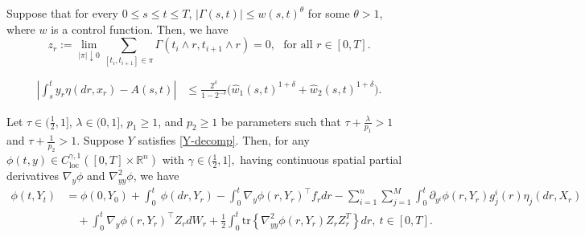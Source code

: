 \documentclass[10pt,a4paper]{amsart}
\begin{document}
\begin{lemma}\label{lem:control's property}
Suppose that for every $0\le s \le t \le T$, $|\Gamma(s,t)|\le w(s,t)^{\theta}$ for some $\theta > 1$, where $w$ is a control function.  Then, we have
\[z_{r} := \lim_{|\pi|\downarrow 0}\sum_{[t_{i},t_{i+1}]\in\pi} \Gamma(t_{i}\land r,t_{i+1}\land r)=0,\ \ \ \text{for all }r\in[0,T].
\] 
\end{lemma}

\begin{equation}\label{e:inequality-estimate-Young}
\begin{aligned}
\left|\int_{s}^{t} y_{r} \eta(dr,x_{r}) - A(s,t)\right| &\le \frac{2^{\delta}}{1-2^{-\delta}}\Big(\hat{w}_1(s,t)^{1+\delta}+\hat{w}_2(s,t)^{1+\delta}\Big).
\end{aligned}
\end{equation}

\begin{proposition}[It\^o's formula]\label{prop:Ito's formula} Let $ \tau\in(\frac12, 1]$, $ \lambda\in(0,1]$, $p_1\ge 1$, and  $p_2\ge1$ be parameters such that $\tau + \frac{\lambda}{p_{1}}>1$ and $\tau + \frac{1}{p_{2}}>1$.  Suppose $Y$ satisfies \eqref{Y-decomp}. Then, for any $\phi(t,y)\in C^{\gamma,1}_{\mathrm{loc}}([0,T]\times\mathbb{R}^{n})$ with $\gamma\in (\frac12, 1],$ having continuous spatial partial derivatives $\nabla_{y}\phi$ and $\nabla^{2}_{yy}\phi$, we have
\begin{equation*}
\begin{aligned}
\phi(t,Y_{t}) &=   \phi(0,Y_{0}) + \int_{0}^{t}\ \phi(dr,Y_{r}) -\int_{0}^{t}\nabla_{y}\phi(r,Y_{r})^{\top} f_{r} dr - \sum_{i=1}^{n}\sum_{j=1}^{M}\int_{0}^{t} \partial_{y^i}\phi(r,Y_{r}) g^{i}_{j}(r)\eta_{j}(dr,X_{r})\\
&\quad + \int_{0}^{t}  \nabla_{y}\phi(r,Y_{r})^{\top} Z_{r} dW_{r} + \frac{1}{2}\int_{0}^{t}\text{tr}\left\{\nabla^{2}_{yy}  \phi(r,Y_{r})Z_{r}Z^{T}_{r}\right\} dr,\ t\in[0,T].
\end{aligned}
\end{equation*}
\end{proposition}
\end{document}
